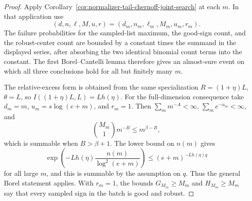 \documentclass[11pt]{amsart}
\numberwithin{equation}{section}
\theoremstyle{definition}
\theoremstyle{remark}
\begin{document}
\begin{proof}
Apply Corollary~\ref{cor:normalizer-tail-chernoff-joint-search} at each \(m\).
In that application use
\[
  (d,n,\ell,M,u,r)=(d_m,n_m,\ell_m,M_m,u_m,r_m).
\]
The failure probabilities for the sampled-list
maximum, the good-sign count, and the robust-center count are bounded by a
constant times the summand in the displayed series, after absorbing the two
identical binomial count terms into the constant.  The first Borel--Cantelli
lemma therefore gives an almost-sure event on which all three conclusions hold
for all but finitely many \(m\).

The relative-excess form is obtained from the same specialization
\(R=(1+\eta)L\), \(\theta=L\), so \(I((1+\eta)L,L)=Lh(\eta)\).  For the
full-dimension consequence take \(d_m=m\), \(u_m=s\log(e+m)\), and \(r_m=1\).
Then \(\sum_m m^{-A}<\infty\), \(\sum_m e^{-u_m}<\infty\), and
\[
  \binom{M_m}{1}m^{-B}\le m^{\beta-B},
\]
which is summable when \(B>\beta+1\).  The lower bound on \(n(m)\) gives
\[
  \exp\left(-Lh(\eta)\frac{n(m)}{\log^2(e+m)}\right)
  \le (e+m)^{-Lh(\eta)q}
\]
for all large \(m\), and this is summable by the assumption on \(q\).  Thus the
general Borel statement applies.  With \(r_m=1\), the bounds
\(G_{M_m}\ge M_m\) and \(H_{M_m}\ge M_m\) say that every sampled sign in the
batch is good and robust.
\end{proof}
\end{document}
